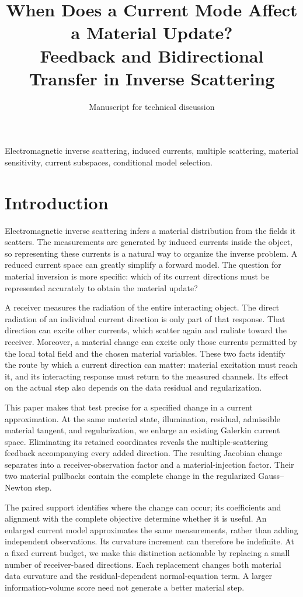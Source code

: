 \documentclass[journal]{IEEEtran}
\title{When Does a Current Mode Affect a Material Update?\\Feedback and Bidirectional Transfer in Inverse Scattering}
\author{Manuscript for technical discussion}
\begin{document}
\maketitle

\begin{IEEEkeywords}Electromagnetic inverse scattering, induced currents, multiple scattering, material sensitivity, current subspaces, conditional model selection.\end{IEEEkeywords}
\section{Introduction}
Electromagnetic inverse scattering infers a material distribution from the fields it scatters. The measurements are generated by induced currents inside the object, so representing these currents is a natural way to organize the inverse problem. A reduced current space can greatly simplify a forward model. The question for material inversion is more specific: which of its current directions must be represented accurately to obtain the material update?

A receiver measures the radiation of the entire interacting object. The direct radiation of an individual current direction is only part of that response. That direction can excite other currents, which scatter again and radiate toward the receiver. Moreover, a material change can excite only those currents permitted by the local total field and the chosen material variables. These two facts identify the route by which a current direction can matter: material excitation must reach it, and its interacting response must return to the measured channels. Its effect on the actual step also depends on the data residual and regularization.

This paper makes that test precise for a specified change in a current approximation. At the same material state, illumination, residual, admissible material tangent, and regularization, we enlarge an existing Galerkin current space. Eliminating its retained coordinates reveals the multiple-scattering feedback accompanying every added direction. The resulting Jacobian change separates into a receiver-observation factor and a material-injection factor. Their two material pullbacks contain the complete change in the regularized Gauss--Newton step.

The paired support identifies where the change can occur; its coefficients and alignment with the complete objective determine whether it is useful. An enlarged current model approximates the same measurements, rather than adding independent observations. Its curvature increment can therefore be indefinite. At a fixed current budget, we make this distinction actionable by replacing a small number of receiver-based directions. Each replacement changes both material data curvature and the residual-dependent normal-equation term. A larger information-volume score need not generate a better material step.
\end{document}
